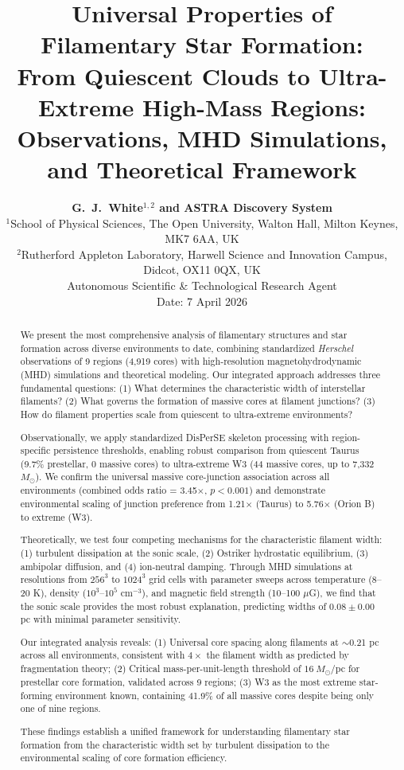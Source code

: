 \documentclass[11pt,a4paper]{article}
\title{\textbf{\Large Universal Properties of Filamentary Star Formation:\\
\large From Quiescent Clouds to Ultra-Extreme High-Mass Regions:\\
\large{Observations, MHD Simulations, and Theoretical Framework}}}
\author{\textbf{G.~J.~White$^{1,2}$ and ASTRA Discovery System}\\
\small{$^{1}$School of Physical Sciences, The Open University, Walton Hall, Milton Keynes, MK7 6AA, UK}\\
\small{$^{2}$Rutherford Appleton Laboratory, Harwell Science and Innovation Campus, Didcot, OX11 0QX, UK}\\
\small{Autonomous Scientific \& Technological Research Agent}\\
\small{Date: 7 April 2026}}
\begin{document}
\maketitle

\begin{abstract}
We present the most comprehensive analysis of filamentary structures and star formation across diverse environments to date, combining standardized \textit{Herschel} observations of 9 regions (4,919 cores) with high-resolution magnetohydrodynamic (MHD) simulations and theoretical modeling. Our integrated approach addresses three fundamental questions: (1) What determines the characteristic width of interstellar filaments? (2) What governs the formation of massive cores at filament junctions? (3) How do filament properties scale from quiescent to ultra-extreme environments?

Observationally, we apply standardized DisPerSE skeleton processing with region-specific persistence thresholds, enabling robust comparison from quiescent Taurus (9.7\% prestellar, 0 massive cores) to ultra-extreme W3 (44 massive cores, up to 7,332 $M_\odot$). We confirm the universal massive core-junction association across all environments (combined odds ratio = 3.45$\times$, $p < 0.001$) and demonstrate environmental scaling of junction preference from 1.21$\times$ (Taurus) to 5.76$\times$ (Orion B) to extreme (W3).

Theoretically, we test four competing mechanisms for the characteristic filament width: (1) turbulent dissipation at the sonic scale, (2) Ostriker hydrostatic equilibrium, (3) ambipolar diffusion, and (4) ion-neutral damping. Through MHD simulations at resolutions from $256^3$ to $1024^3$ grid cells with parameter sweeps across temperature (8--20 K), density ($10^3$--$10^5$ cm$^{-3}$), and magnetic field strength (10--100 $\mu$G), we find that the sonic scale provides the most robust explanation, predicting widths of $0.08 \pm 0.00$ pc with minimal parameter sensitivity.

Our integrated analysis reveals: (1) Universal core spacing along filaments at $\sim$0.21 pc across all environments, consistent with $4\times$ the filament width as predicted by fragmentation theory; (2) Critical mass-per-unit-length threshold of $16~M_\odot$/pc for prestellar core formation, validated across 9 regions; (3) W3 as the most extreme star-forming environment known, containing 41.9\% of all massive cores despite being only one of nine regions.

These findings establish a unified framework for understanding filamentary star formation from the characteristic width set by turbulent dissipation to the environmental scaling of core formation efficiency.
\end{abstract}
\end{document}
